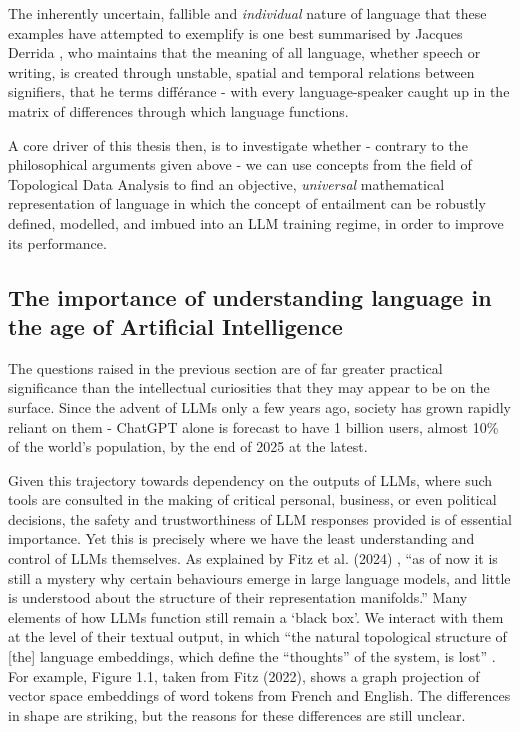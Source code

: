\documentclass[12pt,twoside]{report}
\begin{document}
The inherently uncertain, fallible and \textit{individual} nature of language that these examples have attempted to exemplify is one best summarised by Jacques Derrida \cite{derrida1, derrida2, derrida3}, who maintains that the meaning of all language, whether speech or writing, is created through unstable, spatial and temporal relations between signifiers, that he terms différance - with every language-speaker caught up in the matrix of differences through which language functions. \newline \par

A core driver of this thesis then, is to investigate whether - contrary to the philosophical arguments given above - we can use concepts from the field of Topological Data Analysis to find an objective, \textit{universal} mathematical representation of language in which the concept of entailment can be robustly defined, modelled, and imbued into an LLM training regime, in order to improve its performance.


\subsection{The importance of understanding language in the age of Artificial Intelligence}
The questions raised in the previous section are of far greater practical significance than the intellectual curiosities that they may appear to be on the surface. Since the advent of LLMs only a few years ago, society has grown rapidly reliant on them - ChatGPT alone is forecast to have 1 billion users, almost 10\% of the world's population, by the end of 2025 at the latest. \cite{forbesChatGPT} \newline \par

Given this trajectory towards dependency on the outputs of LLMs, where such tools are consulted in the making of critical personal, business, or even political decisions, the safety and trustworthiness of LLM responses provided is of essential importance. Yet this is precisely where we have the least understanding and control of LLMs themselves. As explained by Fitz et al. (2024) \cite{fitz2024hiddenholestopologicalaspects}, ``as of now it is still a mystery why certain behaviours emerge in large language models, and little is understood about the structure of their representation manifolds.'' Many elements of how LLMs function still remain a `black box'. We interact with them at the level of their textual output, in which ``the natural topological structure of [the] language embeddings, which define the ``thoughts'' of the system, is lost'' \cite{fitz2024hiddenholestopologicalaspects}. For example, Figure 1.1, taken from Fitz (2022), \cite{fitz22a} shows a graph projection of vector space embeddings of word tokens from French and English. The differences in shape are striking, but the reasons for these differences are still unclear. \newline
\end{document}
